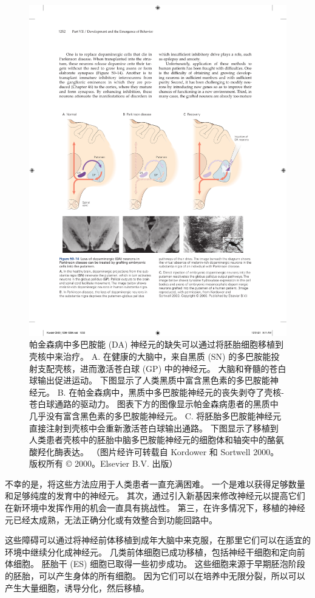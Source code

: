 \begin{figure}[htbp]
	\centering
	\includegraphics[width=0.9\linewidth]{chap50/fig_50_14}
	\caption{帕金森病中多巴胺能 (DA) 神经元的缺失可以通过将胚胎细胞移植到壳核中来治疗。 A. 在健康的大脑中，来自黑质 (SN) 的多巴胺能投射支配壳核，进而激活苍白球 (GP) 中的神经元。 大脑和脊髓的苍白球输出促进运动。 下图显示了人类黑质中富含黑色素的多巴胺能神经元。 B. 在帕金森病中，黑质中多巴胺能神经元的丧失剥夺了壳核-苍白球通路的驱动力。 图表下方的图像显示帕金森病患者的黑质中几乎没有富含黑色素的多巴胺能神经元。 C. 将胚胎多巴胺能神经元直接注射到壳核中会重新激活苍白球输出通路。 下图显示了移植到人类患者壳核中的胚胎中脑多巴胺能神经元的细胞体和轴突中的酪氨酸羟化酶表达。 （图片经许可转载自 Kordower 和 Sortwell 2000。版权所有 © 2000。Elsevier B.V. 出版）}
	\label{fig:50_14}
\end{figure}

不幸的是，将这些方法应用于人类患者一直充满困难。 一个是难以获得足够数量和足够纯度的发育中的神经元。 其次，通过引入新基因来修改神经元以提高它们在新环境中发挥作用的机会一直具有挑战性。 第三，在许多情况下，移植的神经元已经太成熟，无法正确分化或有效整合到功能回路中。

这些障碍可以通过将神经前体移植到成年大脑中来克服，在那里它们可以在适宜的环境中继续分化成神经元。 几类前体细胞已成功移植，包括神经干细胞和定向前体细胞。 胚胎干 (ES) 细胞已取得一些初步成功。 这些细胞来源于早期胚泡阶段的胚胎，可以产生身体的所有细胞。 因为它们可以在培养中无限分裂，所以可以产生大量细胞，诱导分化，然后移植。

